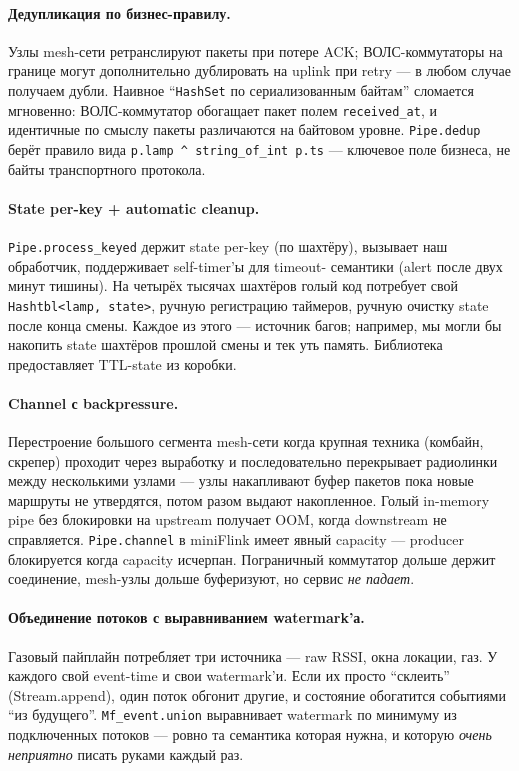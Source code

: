 \paragraph{Дедупликация по бизнес-правилу.} Узлы mesh-сети
ретранслируют пакеты при потере ACK; ВОЛС-коммутаторы на границе
могут дополнительно дублировать на uplink при retry --- в любом случае
получаем дубли. Наивное
``\texttt{HashSet} по сериализованным байтам'' сломается мгновенно:
ВОЛС-коммутатор обогащает пакет полем \texttt{received\_at}, и
идентичные по
смыслу пакеты различаются на байтовом уровне. \texttt{Pipe.dedup}
берёт правило вида \texttt{p.lamp \^{} string\_of\_int p.ts} ---
ключевое поле бизнеса, не байты транспортного протокола.

\paragraph{State per-key + automatic cleanup.}
\texttt{Pipe.process\_keyed} держит state per-key (по шахтёру),
вызывает наш обработчик, поддерживает self-timer'ы для timeout-
семантики (alert после двух минут тишины). На четырёх тысячах
шахтёров голый код потребует свой \texttt{Hashtbl<lamp, state>},
ручную регистрацию таймеров, ручную очистку state после конца
смены. Каждое из этого --- источник багов; например, мы могли бы
накопить state шахтёров прошлой смены и тек уть память. Библиотека
предоставляет TTL-state из коробки.

\paragraph{Channel с backpressure.} Перестроение большого сегмента
mesh-сети когда крупная техника (комбайн, скрепер) проходит через
выработку и последовательно перекрывает радиолинки между несколькими
узлами --- узлы накапливают буфер пакетов пока новые маршруты не
утвердятся, потом разом выдают накопленное. Голый
in-memory pipe без блокировки на upstream получает OOM, когда
downstream не справляется. \texttt{Pipe.channel} в miniFlink имеет
явный capacity --- producer блокируется когда capacity исчерпан.
Пограничный коммутатор дольше держит соединение, mesh-узлы дольше
буферизуют, но сервис \emph{не падает}.

\paragraph{Объединение потоков с выравниванием watermark'а.} Газовый
пайплайн потребляет три источника --- raw RSSI, окна локации, газ.
У каждого свой event-time и свои watermark'и. Если их просто
``склеить'' (Stream.append), один поток обгонит другие, и состояние
обогатится событиями ``из будущего''. \texttt{Mf\_event.union}
выравнивает watermark по минимуму из подключенных потоков --- ровно
та семантика которая нужна, и которую \emph{очень неприятно} писать
руками каждый раз.

